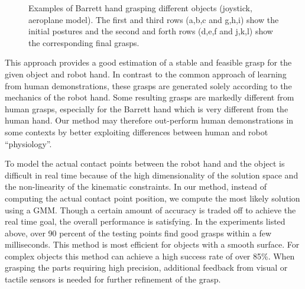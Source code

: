 \begin{figure}

  \caption{\scriptsize{Examples of Barrett hand grasping different objects (joystick, aeroplane model). The first and third rows (a,b,c and g,h,i) show the initial postures and the second and forth rows (d,e,f and j,k,l) show the corresponding final grasps.}
}
    \label{barrett2}
\end{figure}



This approach provides a good estimation of a stable and feasible grasp for the given object and robot hand. In contrast to the common approach of learning from human demonstrations, these grasps are generated solely according to the mechanics of the robot hand. Some resulting grasps are markedly different from  human grasps, especially for the Barrett hand which is very different from the human hand. Our method may therefore out-perform human demonstrations in some contexts by better exploiting differences between human and robot ``physiology''.

To model the actual contact points between the robot hand and the object is difficult in real time because of the high dimensionality of the solution space and the non-linearity of the kinematic constraints. In our method, instead of computing the actual contact point position, we compute the most likely solution using a GMM. Though a certain amount of accuracy is traded off to achieve the real time goal, the overall performance is satisfying. In the experiments listed above, over 90 percent of the testing points find good grasps within a few milliseconds. This method is most efficient for objects with a smooth surface. For complex objects this method can achieve a high success rate of over 85\%. When grasping the parts requiring high precision, additional feedback from visual or tactile sensors is needed for further refinement of the grasp.

